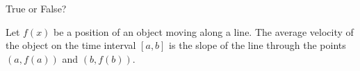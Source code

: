 \documentclass{ximera}
\author{Gregory Hartman \and Matthew Carr}
\begin{document}
\begin{exercise}




True or False?

Let $f(x)$ be a position of an object moving along a line. The average velocity of the object on the time interval $[a,b]$ is the slope of the line through the points $\left(a,f(a)\right)$ and $\left(b,f(b)\right)$.


\begin{prompt}
\begin{multipleChoice}
\end{multipleChoice}
\end{prompt}


\end{exercise}
\end{document}
